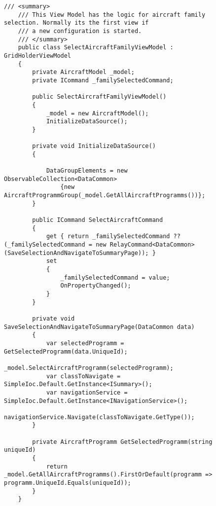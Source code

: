 

\begin{figure}
\begin{lstlisting}
/// <summary>
    /// This View Model has the logic for aircraft family selection. Normally its the first view if
    /// a new configuration is started.
    /// </summary>
    public class SelectAircraftFamilyViewModel : GridHolderViewModel
    {
        private AircraftModel _model;
        private ICommand _familySelectedCommand;

        public SelectAircraftFamilyViewModel()
        {
            _model = new AircraftModel();
            InitializeDataSource();
        }

        private void InitializeDataSource()
        {

            DataGroupElements = new ObservableCollection<DataCommon>
                {new AircraftProgrammGroup(_model.GetAllAircraftProgramms())}; 
        }

        public ICommand SelectAircraftCommand
        {
            get { return _familySelectedCommand ?? (_familySelectedCommand = new RelayCommand<DataCommon>(SaveSelectionAndNavigateToSummaryPage)); }
            set
            {
                _familySelectedCommand = value;
                OnPropertyChanged();
            }
        }

        private void SaveSelectionAndNavigateToSummaryPage(DataCommon data)
        {
            var selectedProgramm = GetSelectedProgramm(data.UniqueId);
            _model.SelectAircraftProgramm(selectedProgramm);
            var classToNavigate = SimpleIoc.Default.GetInstance<ISummary>();
            var navigationService = SimpleIoc.Default.GetInstance<INavigationService>();
            navigationService.Navigate(classToNavigate.GetType());
        }

        private AircraftProgramm GetSelectedProgramm(string uniqueId)
        {
            return _model.GetAllAircraftProgramms().FirstOrDefault(programm => programm.UniqueId.Equals(uniqueId));
        }
    }
\end{lstlisting} 
\label{aircraftFamilySelectionViewModel}
\end{figure}
 




